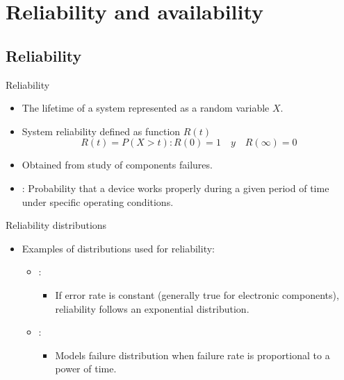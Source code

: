 \section{Reliability and availability}

\subsection{Reliability}

\begin{frame}[t]{Reliability}
\begin{itemize}
  \item The lifetime of a system represented as a random variable
        $X$.

  \item System reliability defined as function $R(t)$
\begin{displaymath}
R(t) = P(X > t) : R(0) = 1 \quad y \quad R(\infty) = 0
\end{displaymath}

  \item Obtained from study of components failures.

  \item {}:
        Probability that a device works properly during a given period of 
        time under specific operating conditions.
        
\end{itemize}
\end{frame}

\begin{frame}[t]{Reliability distributions}
\begin{itemize}
  \item Examples of distributions used for reliability:
    \begin{itemize}
      \item {}:
        \begin{itemize}
          \item If error rate is constant (generally true for electronic components),
                reliability follows an exponential distribution.
        \end{itemize}
      \item {}:
        \begin{itemize}
          \item Models failure distribution when failure rate is proportional to a power of time.
        \end{itemize}
    \end{itemize}
\end{itemize}
\end{frame}


